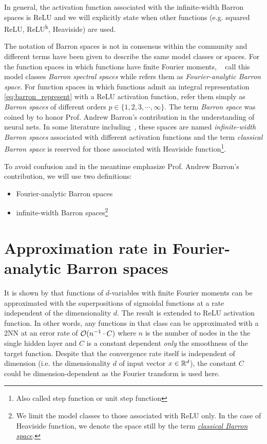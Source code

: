 \TODO

In general, the activation function associated with the infinite-width Barron
spaces is ReLU and we will explicitly state when other functions (e.g. squared
ReLU, ReLU\textsuperscript{k}, Heaviside) are used.

The notation of Barron spaces is not in consensus within the community and
different terms have been given to describe the same model classes or spaces.
For the function spaces in which functions have finite Fourier moments,
~\cite{xuFiniteNeuronMethod2020} call this model classes \textit{Barron spectral
spaces} while \cite{carageaNeuralNetworkApproximation2022} refers them as
\textit{Fourier-analytic Barron space}.  For function spaces in which functions
admit an integral representation \eqref{eq:barron_represent} with a ReLU
activation function, \cite{eBarronSpaceFlowinduced2021} refer them simply as
\textit{Barron spaces} of different orders $p \in \{1, 2, 3, \cdots, \infty\}$.
The term \textit{Barron space} was coined by
\cite{ePrioriEstimatesPopulation2019} to honor Prof. Andrew Barron's
contribution in the understanding of neural nets. In some literature
including~\cite{carageaNeuralNetworkApproximation2022}, these spaces are named
\textit{infinite-width Barron spaces} associated with different activation
functions and the term \textit{classical Barron space} is reserved for those
associated with Heaviside function\footnote{Also called step function or unit
step function}.

To avoid confusion and in the meantime emphasize Prof. Andrew Barron's
contribution, we will use two definitions:
\begin{itemize}
    \item Fourier-analytic Barron spaces
    \item infinite-width Barron spaces\footnote{
        We limit the model classes to those associated with ReLU only. In the 
        case of Heaviside function, we denote the space still by the term 
        \hyperref[def:heaviside_space]{\textit{classical Barron space}}.
    }
\end{itemize}


\section{Approximation rate in Fourier-analytic Barron spaces}
\label{sec:approximation_rate_fouier}

It is shown by \cite{barronUniversalApproximationBounds1993} that functions of
$d$-variables with finite Fourier moments can be approximated with the
superpositions of sigmoidal functions at a rate independent of the
dimensionality $d$. The result is extended to ReLU activation function. In other
words, any functions in that class can be approximated with a 2NN at an error
rate of $\mathcal{O}(n^{-1} \cdot C)$ where $n$ is the number of nodes in the the
single hidden layer and $C$ is a constant dependent \textit{only} the smoothness
of the target function. Despite that the convergence rate itself is independent
of dimension (i.e. the dimensionality $d$ of input vector $x\in\mathbb{R}^d$), the
constant $C$ could be dimension-dependent as the Fourier transform is used here.

